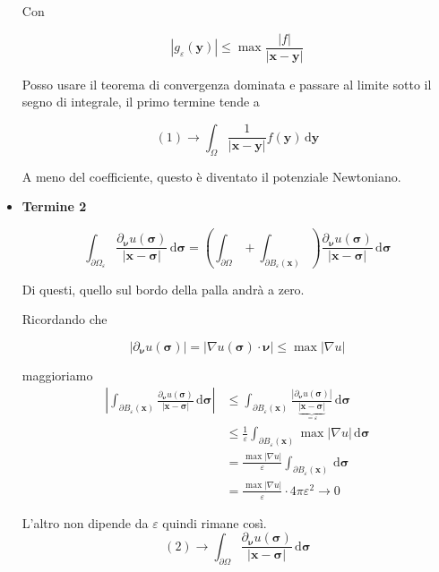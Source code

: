 \documentclass[10pt,a4paper,twoside,openright]{book}
\newcommand{\x}{\mathbf{x}}
\newcommand{\y}{\mathbf{y}}
\newcommand{\sigg}{\bm{\sigma}}
\newcommand{\nuu}{\bm{\nu}}
\newcommand{\de}{\,\mathrm d}
\newcommand{\dyy}{\de \y}
\newcommand{\dsig}{\de \sigg}
\begin{document}
\begin{dimostrazione}
\begin{itemize}
	Con 

	\begin{equation*}
	| g_{\varepsilon }(\y)| \leqslant \max\frac{| f| }{| \x -\y| }
	\end{equation*}

	Posso usare il teorema di convergenza dominata e passare al limite sotto il segno di integrale, il primo termine tende a

	\begin{equation*}
	(1)\rightarrow \int _{\Omega }\frac{1}{| \x -\y| } f(\y) \dyy
	\end{equation*}

	A meno del coefficiente, questo è diventato il potenziale Newtoniano.
	\item \textbf{Termine 2}

	\begin{equation*}
	\int _{\partial \Omega _{\varepsilon }}\frac{\partial _{\nuu} u(\sigg)}{| \x -\sigg| } \dsig =\left(\int _{\partial \Omega } +\int _{\partial B_{\varepsilon }(\x)}\right)\frac{\partial _{\nuu} u(\sigg)}{| \x -\sigg| } \dsig
	\end{equation*}

	Di questi, quello sul bordo della palla andrà a zero.

	Ricordando che

	\begin{equation*}
	| \partial _{\nuu} u(\sigg)| =| \nabla u(\sigg) \cdotp \nuu| \leqslant \max| \nabla u| 
	\end{equation*}

	maggioriamo
	\begin{align*}
	\left| \int _{\partial B_{\varepsilon }(\x)}\frac{\partial _{\nuu} u(\sigg)}{| \x -\sigg| } \dsig\right|  & \leqslant \int _{\partial B_{\varepsilon }(\x)}\frac{| \partial _{\nuu} u(\sigg)| }{\underbrace{| \x -\sigg| }_{=\varepsilon }} \dsig\\
	 & \leqslant \frac{1}{\varepsilon }\int _{\partial B_{\varepsilon }(\x)}\max| \nabla u| \dsig\\
	 & =\frac{\max| \nabla u| }{\varepsilon }\int _{\partial B_{\varepsilon }(\x)} \dsig\\
	 & =\frac{\max| \nabla u| }{\varepsilon } \cdotp 4\pi \varepsilon ^{2}\rightarrow 0
	\end{align*}

	L'altro non dipende da $\displaystyle \varepsilon $ quindi rimane così.
	\begin{equation*}
	(2)\rightarrow \int _{\partial \Omega }\frac{\partial _{\nuu} u(\sigg)}{| \x -\sigg| } \dsig
	\end{equation*}


\end{itemize}
\end{dimostrazione}
\end{document}
